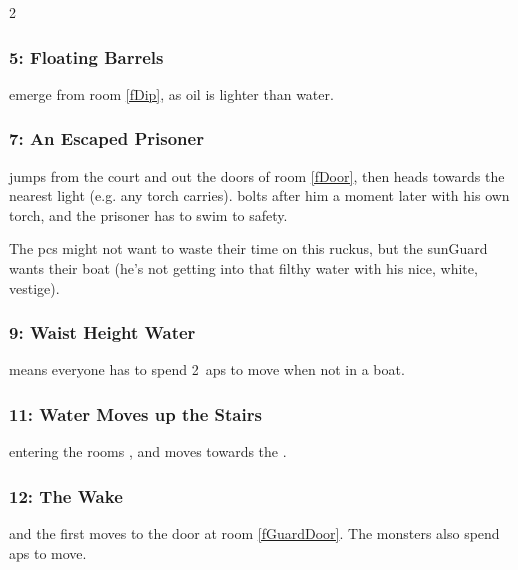 \begin{multicols}{2}
\subsubsection[Floating Barrels]{5: Floating Barrels}
emerge from room \ref{fDip}, as oil is lighter than water.

\subsubsection[An Escaped Prisoner]{7: An Escaped Prisoner}
jumps from the \gls{court} and out the doors of room \vref{fDoor}, then heads towards the nearest light (e.g. any \gls{torch}  carries).
 bolts after him a moment later with his own \gls{torch}, and the prisoner has to swim to safety.

The \glspl{pc} might not want to waste their time on this ruckus, but the \gls{sunGuard} wants their boat (he's not getting into that filthy water with his nice, white, vestige).



\subsubsection[Waist Height Water]{9: Waist Height Water}
means everyone has to spend 2~\glspl{ap} to move when not in a boat.

\subsubsection[Water Moves up the Stairs]{11: Water Moves up the Stairs}
entering the rooms , and moves towards the  .

\subsubsection[The \Glsfmtplural{monster} Wake]{12: The  Wake}
and the first moves to the door at room \vref{fGuardDoor}.
The \glspl{monster} also spend \glspl{ap} to move.
\fridgeMap


\end{multicols}
